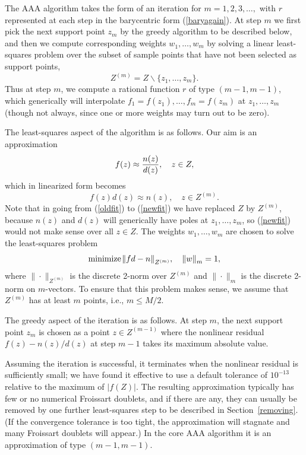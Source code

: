 \documentclass[final]{siamltex}
\def\Zm{Z^{(m)}}
\begin{document}
The AAA algorithm takes the form of an iteration for $m = 1, 2, 3,
\dots ,$ with $r$ represented at each step in the barycentric form
(\ref{baryagain}).  At step $m$ we first pick the next support
point $z_m^{}$ by the greedy algorithm to be described below,
and then we compute corresponding weights $w_1^{},\dots, w_m^{}$
by solving a linear least-squares problem over the subset of
sample points that have not been selected as support points,
\begin{equation} \Zm = Z \backslash \{z_1^{},\dots,z_m{}\}.
\end{equation} Thus at step $m$, we compute a rational function $r$
of type $(m-1,m-1)$, which generically will interpolate $f_1^{} =
f(z_1^{}),\dots,f_m^{}= f(z_m^{})$ at $z_1^{},\dots,z_m^{}$ (though
not always, since one or more weights may turn out to be zero).

The least-squares aspect of the algorithm is as follows.
Our aim is an approximation
\begin{equation}
f(z) \approx {n(z) \over d(z)}, \quad z\in Z,
\label{oldfit}
\end{equation}
which in linearized form becomes
\begin{equation}
f(z)d(z) \approx n(z), \quad z \in \Zm.
\label{newfit}
\end{equation}
Note that in going from
(\ref{oldfit}) to (\ref{newfit}) we have replaced
$Z$ by $\Zm$, because $n(z)$ and
$d(z)$ will generically have poles at $z_1^{},\dots,z_m^{}$,
so (\ref{newfit}) would not make sense over all $z\in Z$.
The weights $w_1^{},\dots, w_m^{}$ are chosen to solve
the least-squares problem
\begin{equation}
\hbox{minimize\kern 1pt } \| fd - n\|_{\Zm}^{}, \quad \|w\|_m^{}=1,
\label{l2prob}
\end{equation}
where $\|\cdot\|_{\Zm}^{}$ is the discrete 2-norm over $\Zm$ and
$\|\cdot\|_m^{}$ is the discrete 2-norm on $m$-vectors.
To ensure that this problem makes sense, we assume that $\Zm$ has at least
$m$ points, i.e., $m \le M/2$.

The greedy aspect of the iteration is as follows.  At step $m$, the
next support point $z_m^{}$ is chosen as a point $z\in Z^{(m-1)}$
where the nonlinear residual $f(z)-n(z)/d(z)$ at step $m-1$
takes its maximum absolute value.

Assuming the iteration is successful, it terminates when the
nonlinear residual is sufficiently small; we have found it
effective to use a default tolerance of $10^{-13}$ relative to the
maximum of $|f(Z)|$.  The resulting approximation typically has
few or no numerical Froissart doublets, and if there are any,
they can usually be removed by one further least-squares step
to be described in Section~\ref{removing}.  (If the convergence
tolerance is too tight, the approximation will stagnate and many
Froissart doublets will appear.)  In the core AAA algorithm it
is an approximation of type $(m-1,m-1)$.
\end{document}
